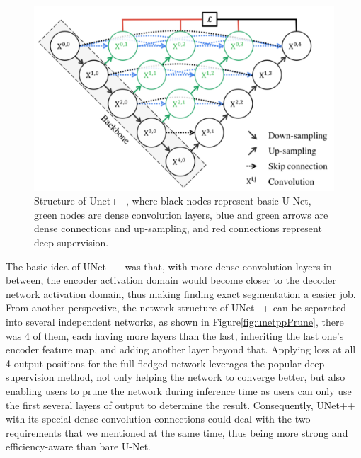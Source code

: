 \begin{figure}[!htpb]
\centering
\includegraphics[scale=0.3]{figuras/unetppStructure.png}
\caption{Structure of Unet++, where black nodes represent basic U-Net, green nodes are dense convolution layers, blue and green arrows are dense connections and up-sampling, and red connections represent deep supervision.}
\label{fig:unetppStructure}
\end{figure}

The basic idea of UNet++ was that, with more dense convolution layers in between, the encoder activation domain would become closer to the decoder network activation domain, thus making finding exact segmentation a easier job. From another perspective, the network structure of UNet++ can be separated into several independent networks, as shown in Figure\ref{fig:unetppPrune}, there was 4 of them, each having more layers than the last, inheriting the last one's encoder feature map, and adding another layer beyond that. Applying loss at all 4 output positions for the full-fledged network leverages the popular deep supervision method, not only helping the network to converge better, but also enabling users to prune the network during inference time as users can only use the first several layers of output to determine the result. Consequently, UNet++ with its special dense convolution connections could deal with the two requirements that we mentioned at the same time, thus being more strong and efficiency-aware than bare U-Net.

